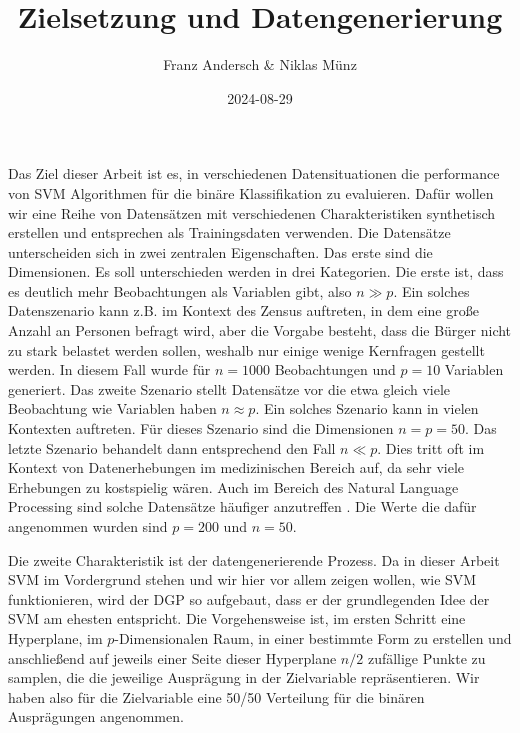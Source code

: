 \documentclass[
]{article}
\title{Zielsetzung und Datengenerierung}
\author{Franz Andersch \& Niklas Münz}
\date{2024-08-29}
\renewcommand{\maketitle}{}
\begin{document}
\maketitle

Das Ziel dieser Arbeit ist es, in verschiedenen Datensituationen die
performance von SVM Algorithmen für die binäre Klassifikation zu
evaluieren. Dafür wollen wir eine Reihe von Datensätzen mit
verschiedenen Charakteristiken synthetisch erstellen und entsprechen als
Trainingsdaten verwenden. Die Datensätze unterscheiden sich in zwei
zentralen Eigenschaften. Das erste sind die Dimensionen. Es soll
unterschieden werden in drei Kategorien. Die erste ist, dass es deutlich
mehr Beobachtungen als Variablen gibt, also \(n \gg p\). Ein solches
Datenszenario kann z.B. im Kontext des Zensus auftreten, in dem eine
große Anzahl an Personen befragt wird, aber die Vorgabe besteht, dass
die Bürger nicht zu stark belastet werden sollen, weshalb nur einige
wenige Kernfragen gestellt werden. In diesem Fall wurde für \(n=1000\)
Beobachtungen und \(p=10\) Variablen generiert. Das zweite Szenario
stellt Datensätze vor die etwa gleich viele Beobachtung wie Variablen
haben \(n \approx p\). Ein solches Szenario kann in vielen Kontexten
auftreten. Für dieses Szenario sind die Dimensionen \(n=p=50\). Das
letzte Szenario behandelt dann entsprechend den Fall \(n \ll p\). Dies
tritt oft im Kontext von Datenerhebungen im medizinischen Bereich auf,
da sehr viele Erhebungen zu kostspielig wären. Auch im Bereich des
Natural Language Processing sind solche Datensätze häufiger anzutreffen
\parencite{scholzComparisonClassificationMethods2021}. Die Werte die
dafür angenommen wurden sind \(p=200\) und \(n=50\).

Die zweite Charakteristik ist der datengenerierende Prozess. Da in
dieser Arbeit SVM im Vordergrund stehen und wir hier vor allem zeigen
wollen, wie SVM funktionieren, wird der DGP so aufgebaut, dass er der
grundlegenden Idee der SVM am ehesten entspricht. Die Vorgehensweise
ist, im ersten Schritt eine Hyperplane, im \(p\)-Dimensionalen Raum, in
einer bestimmte Form zu erstellen und anschließend auf jeweils einer
Seite dieser Hyperplane \(n/2\) zufällige Punkte zu samplen, die die
jeweilige Ausprägung in der Zielvariable repräsentieren. Wir haben also
für die Zielvariable eine 50/50 Verteilung für die binären Ausprägungen
angenommen.
\end{document}
